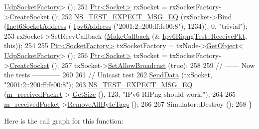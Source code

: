 \begin{DoxyCode}
      \hyperlink{classns3_1_1UdpSocketFactory}{UdpSocketFactory}> ();
251   \hyperlink{classns3_1_1Ptr}{Ptr<Socket>} rxSocket = rxSocketFactory->\hyperlink{classns3_1_1SocketFactory_a97351e6e7860503a4912042530449f62}{CreateSocket} ();
252   \hyperlink{group__testing_ga7304ba46a28d8cf08dfdfd6499cf7068}{NS\_TEST\_EXPECT\_MSG\_EQ} (rxSocket->Bind (\hyperlink{classns3_1_1Inet6SocketAddress}{Inet6SocketAddress} (
      \hyperlink{classns3_1_1Ipv6Address}{Ipv6Address} (\textcolor{stringliteral}{"2001:2::200:ff:fe00:8"}), 1234)), 0, \textcolor{stringliteral}{"trivial"});
253   rxSocket->SetRecvCallback (\hyperlink{group__makecallbackmemptr_ga9376283685aa99d204048d6a4b7610a4}{MakeCallback} (&
      \hyperlink{classIpv6RipngTest_abc3bbb1d39e039609dde2124622bbf0b}{Ipv6RipngTest::ReceivePkt}, \textcolor{keyword}{this}));
254 
255   \hyperlink{classns3_1_1Ptr}{Ptr<SocketFactory>} txSocketFactory = txNode->\hyperlink{classns3_1_1Object_a13e18c00017096c8381eb651d5bd0783}{GetObject}<
      \hyperlink{classns3_1_1UdpSocketFactory}{UdpSocketFactory}> ();
256   \hyperlink{classns3_1_1Ptr}{Ptr<Socket>} txSocket = txSocketFactory->\hyperlink{classns3_1_1SocketFactory_a97351e6e7860503a4912042530449f62}{CreateSocket} ();
257   txSocket->\hyperlink{classns3_1_1Socket_a32b4fa27b732a63207c8d9054a817ed5}{SetAllowBroadcast} (\textcolor{keyword}{true});
258 
259   \textcolor{comment}{// ------ Now the tests ------------}
260 
261   \textcolor{comment}{// Unicast test}
262   \hyperlink{classIpv6RipngTest_a93e154807a5f1b10e4d6fbc1dded827b}{SendData} (txSocket, \textcolor{stringliteral}{"2001:2::200:ff:fe00:8"});
263   \hyperlink{group__testing_ga7304ba46a28d8cf08dfdfd6499cf7068}{NS\_TEST\_EXPECT\_MSG\_EQ} (\hyperlink{classIpv6RipngTest_a1fe2f673eabbd26e6fb0dd5f28ce72eb}{m\_receivedPacket}->
      \hyperlink{classns3_1_1Packet_a462855c9929954d4301a4edfe55f4f1c}{GetSize} (), 123, \textcolor{stringliteral}{"IPv6 RIPng should work."});
264 
265   \hyperlink{classIpv6RipngTest_a1fe2f673eabbd26e6fb0dd5f28ce72eb}{m\_receivedPacket}->\hyperlink{classns3_1_1Packet_a083f54c9db31aeff30551a9e20fcda42}{RemoveAllByteTags} ();
266 
267   Simulator::Destroy ();
268 \}
\end{DoxyCode}


Here is the call graph for this function\+:



